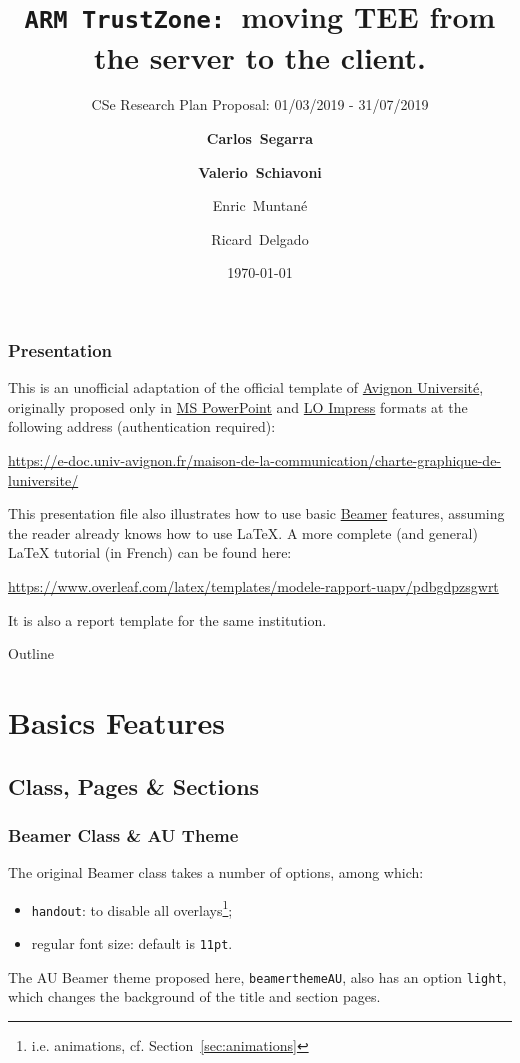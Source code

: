 \documentclass[10pt,    %
    english,            %
    xcolor=table,       %
    envcountsect,        %
    aspectratio=169     %
]{beamer}
\title[\texttt{ARM TZ:}~Research Plan Proposal] %
    {\texttt{ARM TrustZone:}~moving TEE from the server to the client. }
\subtitle{CSe Research Plan Proposal: 01/03/2019 - 31/07/2019} %
\date[Thursday, 28th February] %
    {\today}
\author[] %
{\textbf{Carlos~Segarra}\inst{1} \and \textbf{Valerio~Schiavoni}\inst{2} \and Enric~Muntan\'e\inst{1} \and Ricard~Delgado\inst{1}}
\institute[] %
{\inst{1} CSEM, Neuch\^atel, Switzerland, \texttt{\{first.last\}@csem.ch} \and
\inst{2} University of Neuch\^atel, Switzerland, \texttt{\{valerio.schiavoni\}@unine.ch}
}
\begin{document}
\begin{frame}
  \titlepage
\end{frame}

\begin{frame}
    \label{frm:first}
    \frametitle{Presentation} 
    
    This is an unofficial adaptation of the official template of \href{http://univ-avignon.fr/}{Avignon Université}, originally proposed only in \href{https://en.wikipedia.org/wiki/Microsoft\_PowerPoint}{MS PowerPoint} and \href{https://en.wikipedia.org/wiki/LibreOffice\#Included\_applications}{LO Impress} formats at the following address (authentication required):
    
    \url{https://e-doc.univ-avignon.fr/maison-de-la-communication/charte-graphique-de-luniversite/}
    
    \vspace{0.25cm}
    This presentation file also illustrates how to use basic \href{https://en.wikipedia.org/wiki/Beamer_(LaTeX)}{Beamer} features, assuming the reader already knows how to use \LaTeX{}. A more complete (and general) \LaTeX{} tutorial (in French) can be found here: 
    
    \url{https://www.overleaf.com/latex/templates/modele-rapport-uapv/pdbgdpzsgwrt}
    
    It is also a report template for the same institution.
    
\end{frame}

\begin{frame}{Outline}
    \tableofcontents
\end{frame}


\section{Basics Features}
\label{sec:basics}
\sectionframe

\subsection{Class, Pages \& Sections}
\begin{frame}
    \frametitle{Beamer Class \& AU Theme}
    
    The original Beamer class takes a number of options, among which:
    \begin{itemize}
        \item \texttt{handout}: to disable all overlays\footnote{i.e. animations, cf. Section~\ref{sec:animations}};
        \item regular font size: default is \texttt{11pt}.
    \end{itemize}

    \vspace{0.25cm}
    The AU Beamer theme proposed here, \texttt{beamerthemeAU}, also has an option \texttt{light}, which changes the background of the title and section pages.
\end{frame}
\end{document}
